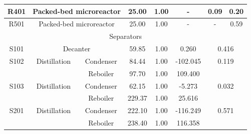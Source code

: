 \begin{table}[h]
{\begin{tabular}{|c|c|c|c|c|c|c|c|c|c|}
R401                  & \multicolumn{2}{c|}{Packed-bed microreactor}        & \multicolumn{2}{c|}{25.00}            & 1.00                            & \multicolumn{2}{c|}{-}              & 0.09                   & 0.20               \\ \hline
R501                  & \multicolumn{2}{c|}{Packed-bed microreactor}        & \multicolumn{2}{c|}{25.00}            & 1.00                            & \multicolumn{2}{c|}{-}              & -                      & 0.59               \\ \hline
\multicolumn{10}{|c|}{Separators}                                                                                                                                                                                                         \\ \hline
S101                  & \multicolumn{2}{c|}{Decanter}                       & \multicolumn{2}{c|}{59.85}            & 1.00                            & \multicolumn{2}{c|}{0.260}          & \multicolumn{2}{c|}{0.416}                  \\ \hline
\multirow{2}{*}{S102} & \multirow{2}{*}{Distillation}       & Condenser     & \multicolumn{2}{c|}{84.44}            & 1.00                            & \multicolumn{2}{c|}{-102.045}       & \multicolumn{2}{c|}{\multirow{2}{*}{0.119}} \\ \cline{3-8}
                      &                                     & Reboiler      & \multicolumn{2}{c|}{97.70}            & 1.00                            & \multicolumn{2}{c|}{109.400}        & \multicolumn{2}{c|}{}                       \\ \hline
\multirow{2}{*}{S103} & \multirow{2}{*}{Distillation}       & Condenser     & \multicolumn{2}{c|}{62.15}            & 1.00                            & \multicolumn{2}{c|}{-5.273}         & \multicolumn{2}{c|}{\multirow{2}{*}{0.032}} \\ \cline{3-8}
                      &                                     & Reboiler      & \multicolumn{2}{c|}{229.37}           & 1.00                            & \multicolumn{2}{c|}{25.616}         & \multicolumn{2}{c|}{}                       \\ \hline
\multirow{2}{*}{S201} & \multirow{2}{*}{Distillation}       & Condenser     & \multicolumn{2}{c|}{222.10}           & 1.00                            & \multicolumn{2}{c|}{-116.249}       & \multicolumn{2}{c|}{\multirow{2}{*}{0.571}} \\ \cline{3-8}
                      &                                     & Reboiler      & \multicolumn{2}{c|}{238.40}           & 1.00                            & \multicolumn{2}{c|}{116.358}        & \multicolumn{2}{c|}{}                       \\ \hline

\end{tabular}}
\end{table}
